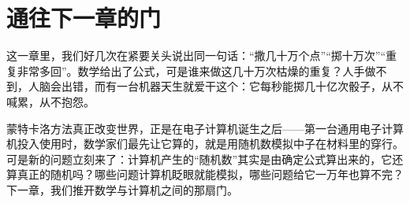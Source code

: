 \section*{通往下一章的门}

这一章里，我们好几次在紧要关头说出同一句话：“撒几十万个点”“掷十万次”“重复非常多回”。数学给出了公式，可是谁来做这几十万次枯燥的重复？人手做不到，人脑会出错，而有一台机器天生就爱干这个：它每秒能掷几十亿次骰子，从不喊累，从不抱怨。

蒙特卡洛方法真正改变世界，正是在电子计算机诞生之后——第一台通用电子计算机投入使用时，数学家们最先让它算的，就是用随机数模拟中子在材料里的穿行。可是新的问题立刻来了：计算机产生的“随机数”其实是由确定公式算出来的，它还算真正的随机吗？哪些问题计算机眨眼就能模拟，哪些问题给它一万年也算不完？下一章，我们推开数学与计算机之间的那扇门。

